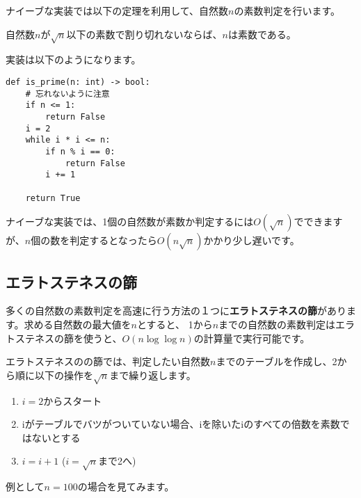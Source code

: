 ナイーブな実装では以下の定理を利用して、自然数$n$の素数判定を行います。

\begin{tcolorbox}[enhanced,title=定理1, 
  attach boxed title to top left, 
  colback=white!95!blue,
  colbacktitle=white!10!blue!50!black,
  drop fuzzy shadow,
  boxrule=0.25mm,
  ]
  自然数$n$が$\sqrt{n}$以下の素数で割り切れないならば、$n$は素数である。
\end{tcolorbox}
実装は以下のようになります。

\begin{lstlisting}[caption=ナイーブな素数判定, frame=TRBL, label={naivePriem}]
def is_prime(n: int) -> bool:
    # 忘れないように注意
    if n <= 1:
        return False
    i = 2
    while i * i <= n:
        if n % i == 0:
            return False
        i += 1
    
    return True

\end{lstlisting}

ナイーブな実装では、1個の自然数が素数か判定するには$O(\sqrt{n})$でできますが、$n$個の数を判定するとなったら$O(n \sqrt{n})$かかり少し遅いです。

\subsection{エラトステネスの篩}
多くの自然数の素数判定を高速に行う方法の１つに\textbf{エラトステネスの篩}があります。求める自然数の最大値を$n$とすると、
1から$n$までの自然数の素数判定はエラトステネスの篩を使うと、$O(n \log \log n)$の計算量で実行可能です。

エラトステネスのの篩では、判定したい自然数$n$までのテーブルを作成し、2から順に以下の操作を$\sqrt{n}$まで繰り返します。

\begin{enumerate}
  \item $i = 2$からスタート
  \item iがテーブルでバツがついていない場合、iを除いたiのすべての倍数を素数ではないとする
  \item $i = i + 1$ ($i = \sqrt{n}$まで2へ)
\end{enumerate}

例として$n = 100$の場合を見てみます。

\newpage


